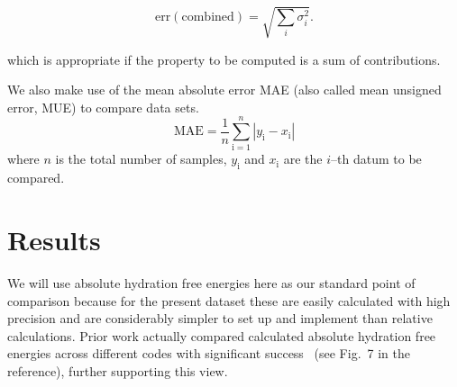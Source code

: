 \documentclass[journal=jctcce,manuscript=article]{achemso}
\begin{document}
\begin{equation}
  \label{eq:sem-comb}
  \mathrm{err}(\mathrm{combined}) = \sqrt{\sum_i \sigma_i^2}.
\end{equation}

which is appropriate if the property to be computed is a sum of
contributions.

We also make use of the mean absolute error MAE (also called mean unsigned 
error, MUE) to compare data sets.
\begin{equation}
\label{eq:MUE}
\mathrm{MAE} = \frac{1}{n}\sum_\mathrm{i=1}^n \left | y_\mathrm{i} - 
x_\mathrm{i} \right |
\end{equation}
where $n$ is the total number of samples, $y_\mathrm{i}$ and $x_\mathrm{i}$ are 
the $i$--th datum to be compared.


\section{Results}
\label{sec:results}

We will use absolute hydration free energies here as our standard point of 
comparison because for the present dataset these are easily calculated with high precision \cite{doi:10.1021/acs.jced.7b00104} %
and are considerably simpler to set up and implement than relative calculations.
Prior work actually compared calculated absolute hydration free energies across 
different codes with significant success~\cite{klimovich_predicting_2010} (see 
Fig.~7 in the reference), further supporting this view.
\end{document}
